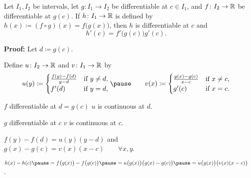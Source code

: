 \documentclass[10pt,aspectratio=149]{beamer}
\begin{document}
\begin{frame}

\begin{proposition}
Let $I_1, I_2$ be intervals, let
$g \colon I_1 \to I_2$ be differentiable at $c \in I_1$,
and
$f \colon I_2 \to {\mathbb{R}}$ be differentiable at $g(c)$.
\pause
If $h \colon I_1 \to {\mathbb{R}}$
is defined by
$h(x) \coloneqq (f \circ g) (x) = f\bigl(g(x)\bigr)$,
\pause
then $h$ is differentiable at $c$ and
\begin{equation*}
h'(c) = f'\bigl(g(c)\bigr)g'(c) .
\end{equation*}
\end{proposition}

\pause
\textbf{Proof:}
Let $d \coloneqq g(c)$.

\pause
Define
$u \colon I_2 \to {\mathbb{R}}$ and $v \colon I_1 \to {\mathbb{R}}$ by
\begin{equation*}
u(y) \coloneqq
\begin{cases}
 \frac{f(y) - f(d)}{y-d}  & \text{if } y \not=d, \\
 f'(d)                    & \text{if } y = d,
\end{cases}
\pause
\qquad
v(x) \coloneqq
\begin{cases}
 \frac{g(x) - g(c)}{x-c} & \text{if } x \not=c, \\
 g'(c)                   & \text{if } x = c.
\end{cases}
\end{equation*}

\pause
$f$ differentiable at $d = g(c)$ \wthus $u$ is continuous at $d$.

\pause
$g$ differentiable at $c$ \wthus $v$ is continuous at $c$.

\pause
\medskip

$f(y)-f(d) = u(y) (y-d)$
\pause
\quad and \quad
$g(x)-g(c) = v(x) (x-c)
\qquad \forall x,y$.

\pause
\medskip

\thus \quad
$
h(x)-h(c)
\pause
=
f\bigl(g(x)\bigr)-f\bigl(g(c)\bigr)
\pause
=
u\bigl( g(x) \bigr) \bigl(g(x)-g(c)\bigr)
\pause
=
u\bigl( g(x) \bigr) \bigl(v(x) (x-c)\bigr)$.

\end{frame}
\end{document}
